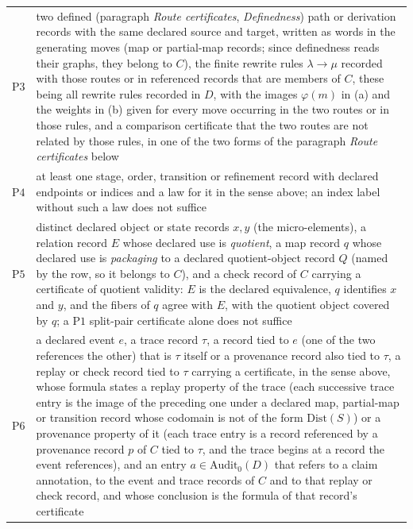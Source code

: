\documentclass[11pt]{article}
\theoremstyle{definition}
\newcommand{\Pone}{\ensuremath{\mathrm{P1}}}
\newcommand{\Pthree}{\ensuremath{\mathrm{P3}}}
\newcommand{\Pfour}{\ensuremath{\mathrm{P4}}}
\newcommand{\Pfive}{\ensuremath{\mathrm{P5}}}
\newcommand{\Psix}{\ensuremath{\mathrm{P6}}}
\begin{document}
\begin{center}
\begin{tabularx}{\linewidth}{@{}l>{\raggedright\arraybackslash}X@{}}
\Pthree{} & two defined (paragraph \emph{Route certificates}, \emph{Definedness}) path or derivation records with the same declared source and target, written as words in the generating moves (map or partial-map records; since definedness reads their graphs, they belong to \(C\)), the finite rewrite rules \(\lambda\to\mu\) recorded with those routes or in referenced records that are members of \(C\), these being all rewrite rules recorded in \(D\), with the images \(\varphi(m)\) in (a) and the weights in (b) given for every move occurring in the two routes or in those rules, and a comparison certificate that the two routes are not related by those rules, in one of the two forms of the paragraph \emph{Route certificates} below \\
\Pfour{} & at least one stage, order, transition or refinement record with declared endpoints or indices and a law for it in the sense above; an index label without such a law does not suffice \\
\Pfive{} & distinct declared object or state records \(x,y\) (the micro-elements), a relation record \(E\) whose declared use is \emph{quotient}, a map record \(q\) whose declared use is \emph{packaging} to a declared quotient-object record \(Q\) (named by the row, so it belongs to \(C\)), and a check record of \(C\) carrying a certificate of quotient validity: \(E\) is the declared equivalence, \(q\) identifies \(x\) and \(y\), and the fibers of \(q\) agree with \(E\), with the quotient object covered by \(q\); a \Pone{} split-pair certificate alone does not suffice \\
\Psix{} & a declared event \(e\), a trace record \(\tau\), a record tied to \(e\) (one of the two references the other) that is \(\tau\) itself or a provenance record also tied to \(\tau\), a replay or check record tied to \(\tau\) carrying a certificate, in the sense above, whose formula states a replay property of the trace (each successive trace entry is the image of the preceding one under a declared map, partial-map or transition record whose codomain is not of the form \(\mathrm{Dist}(S)\)) or a provenance property of it (each trace entry is a record referenced by a provenance record \(p\) of \(C\) tied to \(\tau\), and the trace begins at a record the event references), and an entry \(a\in\mathrm{Audit}_0(D)\) that refers to a claim annotation, to the event and trace records of \(C\) and to that replay or check record, and whose conclusion is the formula of that record's certificate \\
\bottomrule
\end{tabularx}
\label{tab:witness-types}
\end{center}
\end{document}
